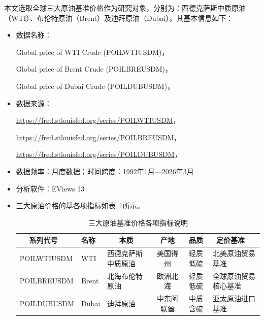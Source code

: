 \documentclass[12pt,a4paper]{ctexart}
\begin{document}
本文选取全球三大原油基准价格作为研究对象，分别为：西德克萨斯中质原油（WTI）、布伦特原油（Brent）及迪拜原油（Dubai），其基本信息如下：
\begin{itemize}
\item 数据名称：

Global price of WTI Crude (POILWTIUSDM)，

Global price of Brent Crude (POILBREUSDM)，

Global price of Dubai Crude (POILDUBUSDM)，

\item 数据来源：

\url{https://fred.stlouisfed.org/series/POILWTIUSDM}，

\url{https://fred.stlouisfed.org/series/POILBREUSDM}，

\url{https://fred.stlouisfed.org/series/POILDUBUSDM}，

\item 数据频率：月度数据；时间跨度：1992年1月—2026年3月

\item 分析软件：EViews 13

\item 三大原油价格的基各项指标如表~\ref{tab:crude_oil_benchmark}所示。
\begin{table}[H]
\centering
\caption{三大原油基准价格各项指标说明}
\label{tab:crude_oil_benchmark}
\begin{tabularx}{\textwidth}{l l X c c X}
\toprule
$\,\,\,\,\,\,\,\,$系列代号 & 名称 & $\quad\,\,\,\,$本质 & 产地 & 品质 & $\,\,\,$定价基准 \\
\midrule
POILWTIUSDM   & WTI     & 西德克萨斯中质原油 & 美国得州 & 轻质低硫 & 北美原油贸易基准 \\
POILBREUSDM   & Brent   & 北海布伦特原油     & 欧洲北海 & 轻质低硫 & 全球原油贸易核心基准 \\
POILDUBUSDM   & Dubai   & 迪拜原油           & 中东阿联酋 & 中质含硫 & 亚太原油进口基准 \\
\bottomrule
\end{tabularx}
\end{table}
\end{itemize}
\end{document}
